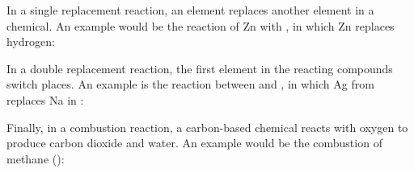 \documentclass[main.tex]{subfiles}
\begin{document}
\begin{description}
\begin{center}\end{center}
In a single replacement reaction, an element replaces another element in a chemical. An example would be the reaction of Zn with , in which Zn replaces hydrogen:
\begin{center}\end{center}
In a double replacement reaction, the first element in the reacting compounds switch places. An example is the reaction between  and , in which Ag from  replaces Na in :
\begin{center}\end{center}
Finally, in a combustion reaction, a carbon-based chemical reacts with oxygen to produce carbon dioxide and water. An example would be the combustion of methane ():
\begin{center}\end{center}





\end{description}
\end{document}
